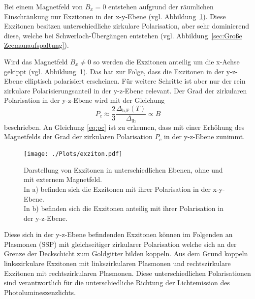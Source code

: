 Bei einem Magnetfeld von $B_{x} = 0$ entstehen aufgrund der räumlichen Einschränkung nur
Exzitonen in der x-y-Ebene (vgl. Abbildung~\ref{fig:exziton}).\cite{felix}
Diese Exzitonen besitzen unterschiedliche zirkulare Polarisation, aber sehr dominierend diese, welche bei 
Schwerloch-Übergängen entstehen (vgl. Abbildung~\ref{sec:Große Zeemanaufspaltung}).


Wird das Magnetfeld $B_{x} \neq 0 $ so werden die Exzitonen anteilig um die x-Achse gekippt (vgl. Abbildung~\ref{fig:exziton}).
Das hat zur Folge, dass die Exzitonen in der y-z-Ebene elliptisch polarisiert erscheinen. 
Für weitere Schritte ist aber nur der rein zirkulare Polarisierungsanteil in der y-z-Ebene relevant.
Der Grad der zirkularen Polarisation in der y-z-Ebene wird mit der Gleichung
\begin{equation}
    P_c \approx \frac{2}{3} \frac{\Delta_\text{h,F}(T)}{\Delta_\text{lh}} \propto B
    \label{eq:pc}
\end{equation}  %
beschrieben.
An Gleichung \ref{eq:pc} ist zu erkennen, dass mit einer Erhöhung des Magnetfelds der Grad der zirkularen Polarisation $P_{c}$
in der y-z-Ebene zunimmt.
\begin{figure}
    \centering
    \texttt{[image: ./Plots/exziton.pdf]}
    \caption{Darstellung von Exzitonen in unterschiedlichen Ebenen, ohne und mit externem Magnetfeld.\\
    In a) befinden sich die Exzitonen mit ihrer Polarisation in der x-y-Ebene.\\
    In b) befinden sich die Exzitonen anteilig mit ihrer Polarisation in der y-z-Ebene.\cite{lars}}
    \label{fig:exziton}
\end{figure}
\FloatBarrier

Diese sich in der y-z-Ebene befindenden Exzitonen können im Folgenden an
Plasmonen (SSP) mit gleichseitiger zirkularer Polarisation
welche sich an der Grenze der Deckschicht zum Goldgitter 
bilden koppeln.
Aus dem Grund koppeln linkszirkulare Exzitonen mit linkszirkularen Plasmonen und 
rechtszirkulare Exzitonen mit rechtszirkularen Plasmonen.
Diese unterschiedlichen Polarisationen sind verantwortlich für die 
unterschiedliche Richtung der Lichtemission des Photolumineszenzlichts.

